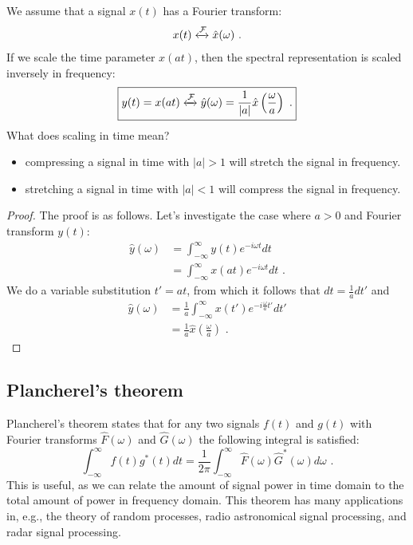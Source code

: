 We assume that a signal $x(t)$ has a Fourier transform:
\begin{align}
x(t) \xleftrightarrow{\mathcal{F}} \hat{x}(\omega)\,\,.
\end{align}
If we scale the time parameter $x(at)$, then the spectral representation is scaled inversely in frequency:
\begin{align}
\boxed{
  y(t) = x(at) \xleftrightarrow{\mathcal{F}} \hat{y}(\omega) = \frac{1}{|a|}\hat{x}\left(\frac{\omega}{a}\right)\,\,.
  \label{eq:timescale_ft_pair}
}
\end{align}
What does scaling in time mean?
\begin{itemize}
\item compressing a signal in time with $|a|>1$ will stretch the signal in frequency.
\item stretching a signal in time with $|a|<1$ will compress the signal in frequency. 
\end{itemize}
\begin{proof}
The proof is as follows. Let's investigate the case where $a > 0$ and Fourier transform $y(t)$:
\begin{align}
\hat{y}(\omega) &= \int_{-\infty}^{\infty} y(t) e^{-i\omega t}dt\\
                &= \int_{-\infty}^{\infty} x(at) e^{-i\omega t}dt\,\,.
\end{align}
We do a variable substitution $t'=at$, from which it follows that $dt=\frac{1}{a}dt'$ and 
\begin{align}
\hat{y}(\omega) &= \frac{1}{a}\int_{-\infty}^{\infty} x(t') e^{-i\frac{\omega}{a} t' }dt'\\
 &= \frac{1}{a}\hat{x}\left(\frac{\omega}{a} \right)\,\,.
\end{align}
\end{proof}







\subsection{Plancherel's theorem}

Plancherel's theorem states that for any two signals $f(t)$ and $g(t)$ with Fourier transforms $\hat{F}(\omega)$ and $\hat{G}(\omega)$ the following integral is satisfied:
\begin{equation}
\boxed{
\int_{-\infty}^{\infty} f(t) g^*(t) dt = \frac{1}{2\pi} \int_{-\infty}^{\infty}  \hat{F}(\omega)\hat{G}^*(\omega) d\omega\,\,.
}
\label{eq:ft_plancherel_theorem}
\end{equation}
This is useful, as we can relate the amount of signal power in time domain to the total amount of power in frequency domain. This theorem has many applications in, e.g., the 
theory of random processes, radio astronomical signal processing, and radar signal processing.


